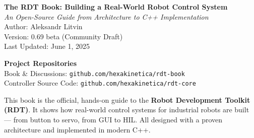 \begin{titlepage}
  \centering
  \vspace*{3cm}
  
  {\Huge \bfseries The RDT Book: Building a Real-World Robot Control System}\\[2ex]
  
  {\Large \itshape An Open-Source Guide from Architecture to C++ Implementation}\\[8ex]
  

  {\Large Author: Aleksandr Litvin}\\[5ex]
  

  {\large Version: 0.69 beta (Community Draft)}\\[1ex]
  {\large Last Updated: June 1, 2025}
  
  \vfill %
  

  \begin{center}
    \large
    \textbf{Project Repositories}\\[2ex]
    Book \& Discussions: \texttt{github.com/hexakinetica/rdt-book}\\[1ex]
    Controller Source Code: \texttt{github.com/hexakinetica/rdt-core}
  \end{center}
  
  \vfill %
  

  \begin{center}
  \large
  This book is the official, hands-on guide to the \textbf{Robot Development Toolkit (RDT)}. 
  It shows how real-world control systems for industrial robots are built — from button to servo, 
  from GUI to HIL. All designed with a proven architecture and implemented in modern C++.
  \end{center}

\end{titlepage}